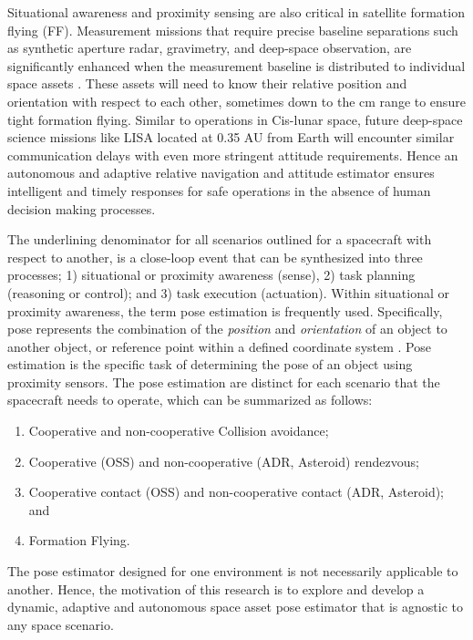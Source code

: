 Situational awareness and proximity sensing are also critical in satellite formation flying (FF). Measurement missions that require precise baseline separations such as synthetic aperture radar, gravimetry, and deep-space observation, are significantly enhanced when the measurement baseline is distributed to individual space assets \cite{frasierAdaptiveKF18}. These assets will need to know their relative position and orientation with respect to each other, sometimes down to the cm range to ensure tight formation flying.  Similar to operations in Cis-lunar space, future deep-space science missions like LISA located at 0.35 AU from Earth \cite{amatoFormationFlying19} will encounter similar communication delays with even more stringent attitude requirements. Hence an autonomous and adaptive relative navigation and attitude estimator ensures intelligent and timely responses for safe operations in the absence of human decision making processes.   

The underlining denominator for all scenarios outlined for a spacecraft with respect to another, is a close-loop event that can be synthesized into three processes; 1) situational or proximity awareness (sense), 2) task planning (reasoning or control); and 3) task execution (actuation). Within situational or proximity awareness, the term pose estimation is frequently used. Specifically, pose represents the combination of the \textit{position} and \textit{orientation} of an object  to another object, or reference point within a defined coordinate system \cite{PrezVillar2017SpacecraftPE} .  Pose estimation is the specific task of determining the pose of an object using proximity sensors. The pose estimation are distinct for each scenario that the spacecraft needs to operate, which can be summarized as follows:
\begin{enumerate}
    \item Cooperative and non-cooperative Collision avoidance; 
    \item Cooperative (OSS) and non-cooperative (ADR, Asteroid) rendezvous; 
    \item Cooperative contact (OSS)  and non-cooperative contact (ADR, Asteroid); and
    \item Formation Flying.
\end{enumerate}

The pose estimator designed for one environment is not necessarily applicable to another. Hence, the motivation of this research is to explore and develop a dynamic, adaptive and autonomous space asset pose estimator that is agnostic to any space scenario.

